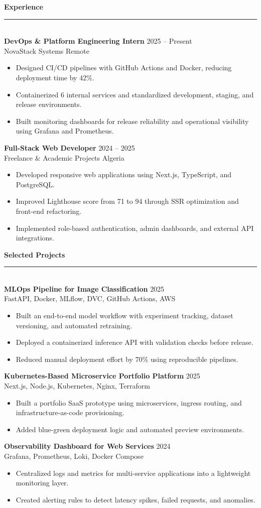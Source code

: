 \documentclass[10pt,a4paper]{article}
\newcommand{\sectiontitle}[1]{
  \vspace{0.55em}
  {\large\bfseries\color{ink}#1}\\[-0.15em]
  {\color{accent}\rule{2.4cm}{1pt}}\\[0.25em]
}
\newcommand{\entry}[4]{
  \textbf{#1} \hfill {\color{accentdark}\small #2}\\
  {\color{soft}#3} \hfill {\color{muted}\small #4}\\[-0.25em]
}
\newcommand{\project}[3]{
  \textbf{#1} \hfill {\color{accentdark}\small #2}\\
  {\color{soft}#3}\\[-0.2em]
}
\begin{document}
\begin{minipage}[t]{0.62\textwidth}
\sectiontitle{Experience}
\entry{DevOps \& Platform Engineering Intern}{2025 -- Present}{NovaStack Systems}{Remote}
\begin{itemize}
  \item Designed CI/CD pipelines with GitHub Actions and Docker, reducing deployment time by 42\%.
  \item Containerized 6 internal services and standardized development, staging, and release environments.
  \item Built monitoring dashboards for release reliability and operational visibility using Grafana and Prometheus.
\end{itemize}

\entry{Full-Stack Web Developer}{2024 -- 2025}{Freelance \& Academic Projects}{Algeria}
\begin{itemize}
  \item Developed responsive web applications using Next.js, TypeScript, and PostgreSQL.
  \item Improved Lighthouse score from 71 to 94 through SSR optimization and front-end refactoring.
  \item Implemented role-based authentication, admin dashboards, and external API integrations.
\end{itemize}

\sectiontitle{Selected Projects}
\project{MLOps Pipeline for Image Classification}{2025}{FastAPI, Docker, MLflow, DVC, GitHub Actions, AWS}
\begin{itemize}
  \item Built an end-to-end model workflow with experiment tracking, dataset versioning, and automated retraining.
  \item Deployed a containerized inference API with validation checks before release.
  \item Reduced manual deployment effort by 70\% using reproducible pipelines.
\end{itemize}

\project{Kubernetes-Based Microservice Portfolio Platform}{2025}{Next.js, Node.js, Kubernetes, Nginx, Terraform}
\begin{itemize}
  \item Built a portfolio SaaS prototype using microservices, ingress routing, and infrastructure-as-code provisioning.
  \item Added blue-green deployment logic and automated preview environments.
\end{itemize}

\project{Observability Dashboard for Web Services}{2024}{Grafana, Prometheus, Loki, Docker Compose}
\begin{itemize}
  \item Centralized logs and metrics for multi-service applications into a lightweight monitoring layer.
  \item Created alerting rules to detect latency spikes, failed requests, and anomalies.
\end{itemize}

\end{minipage}
\end{document}
